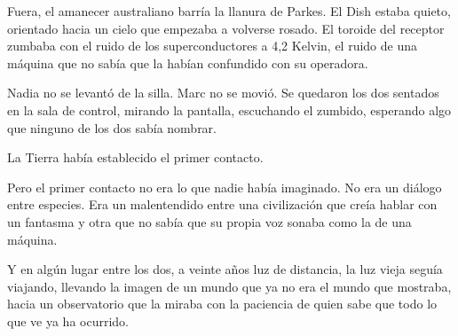 \documentclass[11pt,a5paper,twoside]{book}
\begin{document}
Fuera, el amanecer australiano barría la llanura de Parkes. El Dish estaba quieto, orientado hacia un cielo que empezaba a volverse rosado. El toroide del receptor zumbaba con el ruido de los superconductores a 4,2 Kelvin, el ruido de una máquina que no sabía que la habían confundido con su operadora.

Nadia no se levantó de la silla. Marc no se movió. Se quedaron los dos sentados en la sala de control, mirando la pantalla, escuchando el zumbido, esperando algo que ninguno de los dos sabía nombrar.

La Tierra había establecido el primer contacto.

Pero el primer contacto no era lo que nadie había imaginado. No era un diálogo entre especies. Era un malentendido entre una civilización que creía hablar con un fantasma y otra que no sabía que su propia voz sonaba como la de una máquina.

Y en algún lugar entre los dos, a veinte años luz de distancia, la luz vieja seguía viajando, llevando la imagen de un mundo que ya no era el mundo que mostraba, hacia un observatorio que la miraba con la paciencia de quien sabe que todo lo que ve ya ha ocurrido.
\end{document}
